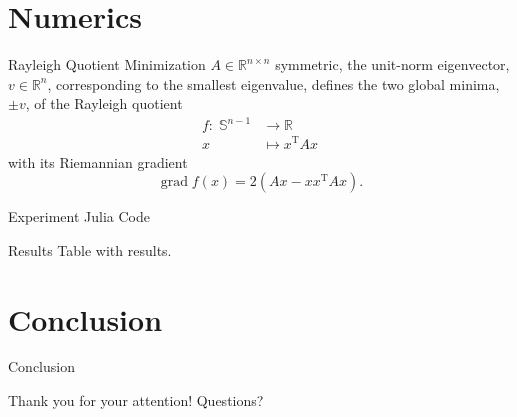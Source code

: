 \documentclass{beamer}
\begin{document}
\section{Numerics}

\begin{frame}{Rayleigh Quotient Minimization}
    $A \in \mathbb{R}^{n \times n}$ symmetric, the unit-norm eigenvector, $v \in \mathbb{R}^n$, corresponding to the smallest eigenvalue, defines the two global minima, $\pm v$, of the Rayleigh quotient  
    \begin{equation*}
        \begin{split}
            f \colon \; \mathbb{S}^{n-1} & \to \mathbb{R} \\
            x & \mapsto x^{\mathrm{T}} A x 
        \end{split}
    \end{equation*}   
    with its Riemannian gradient \\[.3\baselineskip]
    \begin{equation*}
        \operatorname{grad} f(x) = 2(Ax - x x^{\mathrm{T}} A x).
    \end{equation*}
\end{frame}

\begin{frame}{Experiment}
    Julia Code
\end{frame}

\begin{frame}{Results}
    Table with results.
\end{frame}

\section{Conclusion}

\begin{frame}{Conclusion}
    
    \begin{center}
        Thank you for your attention! Questions? 
    \end{center}
\end{frame}
\end{document}
